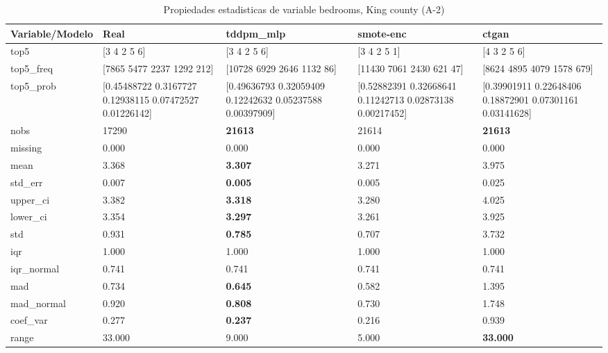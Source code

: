 \begin{table}[H]
\centering
\fontsize{8}{14}\selectfont
\caption{Propiedades  estadisticas de variable bedrooms, King county (A-2)}
\label{table-stats-king county-a-2-bedrooms}
\begin{tabular}{|l|m{10em}|m{10em}|m{10em}|m{10em}|}
\hline
 \rowcolor[gray]{0.8}
Variable/Modelo & Real & tddpm\_mlp & smote-enc & ctgan \\
\hline top5 & [3 4 2 5 6] & [3 4 2 5 6] & [3 4 2 5 1] & [4 3 2 5 6] \\
\hline top5\_freq & [7865 5477 2237 1292  212] & [10728  6929  2646  1132    86] & [11430  7061  2430   621    47] & [8624 4895 4079 1578  679] \\
\hline top5\_prob & [0.45488722 0.3167727  0.12938115 0.07472527 0.01226142] & [0.49636793 0.32059409 0.12242632 0.05237588 0.00397909] & [0.52882391 0.32668641 0.11242713 0.02873138 0.00217452] & [0.39901911 0.22648406 0.18872901 0.07301161 0.03141628] \\
\hline nobs & 17290 & \bfseries 21613 & \cellcolor[rgb]{0.9, 0.54, 0.52} 21614 & \bfseries 21613 \\
\hline missing & 0.000 & 0.000 & 0.000 & 0.000 \\
\hline mean & 3.368 & \bfseries 3.307 & 3.271 & \cellcolor[rgb]{0.9, 0.54, 0.52} 3.975 \\
\hline std\_err & 0.007 & \bfseries 0.005 & 0.005 & \cellcolor[rgb]{0.9, 0.54, 0.52} 0.025 \\
\hline upper\_ci & 3.382 & \bfseries 3.318 & 3.280 & \cellcolor[rgb]{0.9, 0.54, 0.52} 4.025 \\
\hline lower\_ci & 3.354 & \bfseries 3.297 & 3.261 & \cellcolor[rgb]{0.9, 0.54, 0.52} 3.925 \\
\hline std & 0.931 & \bfseries 0.785 & 0.707 & \cellcolor[rgb]{0.9, 0.54, 0.52} 3.732 \\
\hline iqr & 1.000 & 1.000 & 1.000 & 1.000 \\
\hline iqr\_normal & 0.741 & 0.741 & 0.741 & 0.741 \\
\hline mad & 0.734 & \bfseries 0.645 & 0.582 & \cellcolor[rgb]{0.9, 0.54, 0.52} 1.395 \\
\hline mad\_normal & 0.920 & \bfseries 0.808 & 0.730 & \cellcolor[rgb]{0.9, 0.54, 0.52} 1.748 \\
\hline coef\_var & 0.277 & \bfseries 0.237 & 0.216 & \cellcolor[rgb]{0.9, 0.54, 0.52} 0.939 \\
\hline range & 33.000 & 9.000 & \cellcolor[rgb]{0.9, 0.54, 0.52} 5.000 & \bfseries 33.000 \\

\end{tabular}
\end{table}
